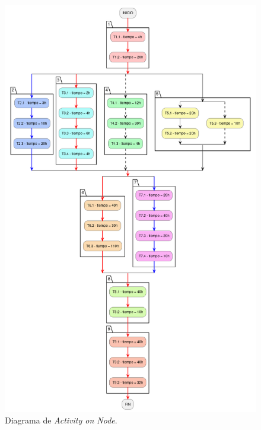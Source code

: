 \begin{figure}[htpb]
  \centering
  \includegraphics[width=.90\textwidth]{./assets/AoN.png}
  \caption{Diagrama de \textit{Activity on Node}.}
  \label{fig:AoN}
\end{figure}

\vspace{25px}

